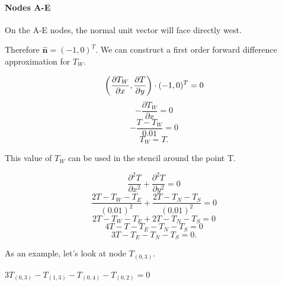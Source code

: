\documentclass[12pt,a4paper]{article}
\begin{document}
\paragraph*{Nodes A-E}
On the A-E nodes, the normal unit vector will face directly west.
\begin{center}
\end{center}
Therefore $\hat{\textbf{n}} = (-1,0)^T$. We can construct a first order forward difference approximation for $T_W$.
\begin{center}
\[\bigg{(}\frac{\partial T_W}{\partial x},\frac{\partial T}{\partial y}\bigg{)}\cdot (-1,0)^T = 0\]
\[-\frac{\partial T_W}{\partial x} = 0\]
\[-\frac{T-T_W}{0.01} = 0\]
\[T_W = T.\]
\end{center}
This value of $T_W$ can be used in the stencil around the point T.
\begin{center}
\[\frac{\partial^2 T}{\partial x^2}+\frac{\partial^2 T}{\partial y^2}=0\]
\[\frac{2T-T_W-T_E}{(0.01)^2}+\frac{2T-T_N-T_S}{(0.01)^2}=0\]
\[2T-T_W-T_E+2T-T_N-T_S=0\]
\[4T-T-T_E-T_N-T_S=0\]
\[3T-T_E-T_N-T_S=0.\]
\end{center}

As an example, let's look at node $T_{(0, 3)}$. 
\begin{center}
  $3T_{(0,3)}-T_{(1,3)}-T_{(0,4)}-T_{(0,2)}=0$
\end{center}
\end{document}
